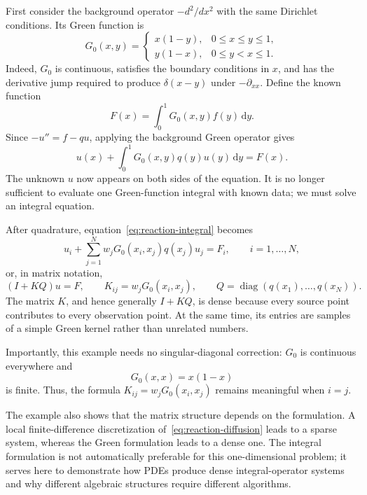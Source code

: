 First consider the background operator $-d^2/dx^2$ with the same Dirichlet conditions. Its Green function is
\begin{equation}
    G_0(x,y)=
    \begin{cases}
        x(1-y), & 0\leq x\leq y\leq1,\\
        y(1-x), & 0\leq y<x\leq1.
    \end{cases}
    \label{eq:dirichlet-green}
\end{equation}
Indeed, $G_0$ is continuous, satisfies the boundary conditions in $x$, and has the derivative jump required to produce $\delta(x-y)$ under $-\partial_{xx}$. Define the known function
\begin{equation}
    F(x)=\int_0^1G_0(x,y)f(y)\,\mathrm{d}y.
    \label{eq:reaction-source}
\end{equation}
Since $-u''=f-qu$, applying the background Green operator gives
\begin{equation}
    u(x)+\int_0^1G_0(x,y)q(y)u(y)\,\mathrm{d}y=F(x).
    \label{eq:reaction-integral}
\end{equation}
The unknown $u$ now appears on both sides of the equation. It is no longer sufficient to evaluate one Green-function integral with known data; we must solve an integral equation.

After quadrature, equation~\eqref{eq:reaction-integral} becomes
\begin{equation}
    u_i+\sum_{j=1}^{N}w_jG_0(x_i,x_j)q(x_j)u_j=F_i,
    \qquad i=1,\ldots,N,
    \label{eq:reaction-discrete-sum}
\end{equation}
or, in matrix notation,
\begin{equation}
    (I+KQ)u=F,
    \qquad K_{ij}=w_jG_0(x_i,x_j),
    \qquad Q=\operatorname{diag}(q(x_1),\ldots,q(x_N)).
    \label{eq:reaction-system}
\end{equation}
The matrix $K$, and hence generally $I+KQ$, is dense because every source point contributes to every observation point. At the same time, its entries are samples of a simple Green kernel rather than unrelated numbers.

Importantly, this example needs no singular-diagonal correction: $G_0$ is continuous everywhere and
\begin{equation}
    G_0(x,x)=x(1-x)
    \label{eq:green-diagonal}
\end{equation}
is finite. Thus, the formula $K_{ij}=w_jG_0(x_i,x_j)$ remains meaningful when $i=j$.

The example also shows that the matrix structure depends on the formulation. A local finite-difference discretization of~\eqref{eq:reaction-diffusion} leads to a sparse system, whereas the Green formulation leads to a dense one. The integral formulation is not automatically preferable for this one-dimensional problem; it serves here to demonstrate how PDEs produce dense integral-operator systems and why different algebraic structures require different algorithms.

